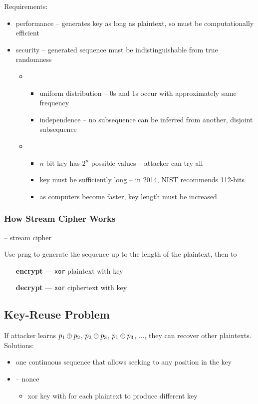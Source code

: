 \documentclass[draft]{article}
\begin{document}
Requirements:
\begin{itemize}[nosep]
    \item performance -- generates key as long as plaintext, so must be computationally efficient
    \item security -- generated sequence must be indistinguishable from true randomness
          \begin{itemize}
              \item {}
                    \begin{itemize}[nosep]
                        \item uniform distribution -- 0s and 1s occur with approximately same frequency
                        \item independence -- no subsequence can be inferred from another, disjoint subsequence
                    \end{itemize}
              \item {}
                    \begin{itemize}[nosep]
                        \item $n$ bit key has $2^n$ possible values -- attacker can try all
                        \item key must be sufficiently long -- in 2014, NIST recommends 112-bits
                        \item as computers become faster, key length must be increased
                    \end{itemize}
          \end{itemize}
\end{itemize}

\subsubsection*{How Stream Cipher Works}
 -- \glsdesc*{stream cipher}

Use \acrshort{prng} to generate the sequence up to the length of the plaintext, then to
\begin{itemize}[nosep, align=left, leftmargin=1in]
    \item[\textbf{encrypt} ---] \texttt{xor} plaintext with key
    \item[\textbf{decrypt} ---] \texttt{xor} ciphertext with key
\end{itemize}
\subsection{Key-Reuse Problem}
If attacker learns $p_1 \oplus p_2$, $p_2 \oplus p_3$, $p_1 \oplus p_3$, $\dots$, they can recover other plaintexts.
Solutions:
\begin{itemize}[nosep]
    \item one continuous sequence that allows seeking to any position in the key
    \item {} -- \glsdesc{nonce}
          \begin{itemize}[nosep]\item xor key with  for each plaintext to produce different key\end{itemize}
\end{itemize}
\end{document}
